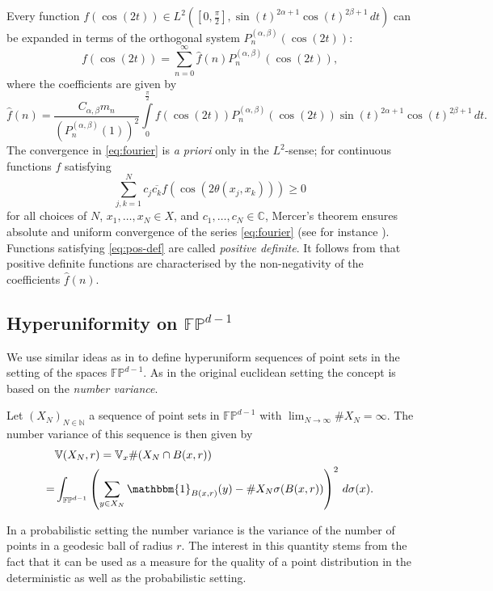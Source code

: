 Every function 
$f(\cos(2t))\in L^2([0,\frac\pi2],\sin(t)^{2\alpha+1}\cos(t)^{2\beta+1}\,dt)$
can be expanded in terms of the orthogonal system
$P_n^{(\alpha,\beta)}(\cos(2t))$:
\begin{equation}\label{eq:fourier}
  f(\cos(2t))=\sum_{n=0}^\infty \widehat{f}(n)P_n^{(\alpha,\beta)}(\cos(2t)),
\end{equation}
where the coefficients are given by
\begin{equation*}
  \widehat{f}(n)=\frac{C_{\alpha,\beta}m_n}{\left(P_n^{(\alpha,\beta)}(1)\right)^2}
  \int\limits_0^{\frac\pi 2}f(\cos(2t))P_n^{(\alpha,\beta)}(\cos(2t))
  \sin(t)^{2\alpha+1}\cos(t)^{2\beta+1}\,dt.
\end{equation*}
The convergence in \eqref{eq:fourier} is \emph{a priori} only in the
$L^2$-sense; for continuous functions $f$ satisfying
\begin{equation}\label{eq:pos-def}
  \sum_{j,k=1}^Nc_j\overline{c_k}f(\cos(2\theta(x_j,x_k)))\geq0
\end{equation}
for all choices of $N$, $x_1,\ldots,x_N\in X$, and
$c_1,\ldots,c_N\in\mathbb{C}$, Mercer's theorem ensures absolute and uniform
convergence of the series \eqref{eq:fourier} (see for instance
\cite{Ferreira_Menegatto2009:eigenvalues_integral_operators}). Functions
satisfying \eqref{eq:pos-def} are called \emph{positive definite}. It follows
from \cite{Bochner1941:Positive_Definite} that positive definite functions are
characterised by the non-negativity of the coefficients $\widehat{f}(n)$.

\subsection{Hyperuniformity on $\mathbb{FP}^{d-1}$}
We use similar ideas as in
\cite{Brauchart_Grabner_Kusner+2020:hyperuniform_point_sets,
  Brauchart_Grabner_Kusner2019:hyperuniform_deterministic}
to define hyperuniform sequences of point sets in the setting of the spaces
$\mathbb{FP}^{d-1}$. As in the original euclidean setting the concept is based
on the \emph{number variance}.
\begin{definition}\label{def-hyper}
  Let $(X_N)_{N\in\mathbb{N}}$ a sequence of point sets in $\mathbb{FP}^{d-1}$
  with $\lim_{N\to\infty}\#X_N=\infty$. The number variance of this sequence is
  then given by
  \begin{equation}
    \label{eq:variance}
    \begin{split}
      &\mathbb{V}(X_N,r)=\mathbb{V}_x\#(X_N\cap B(x,r))\\
      =&
      \int_{\mathbb{FP}^{d-1}}\left(\sum_{y\in X_N}\mathbbm{1}_{B(x,r)}(y)-
        \#X_N\sigma(B(x,r))\right)^2\,d\sigma(x).
    \end{split}
  \end{equation}
\end{definition}
In a probabilistic setting the number variance is the variance of the number of
points in a geodesic ball of radius $r$. The interest in this quantity stems
from the fact that it can be used as a measure for the quality of a point
distribution in the deterministic as well as the probabilistic setting.


